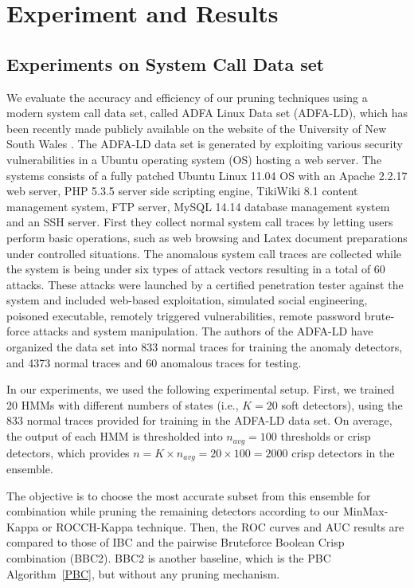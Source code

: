 \chapter{Experiment and Results} \label{chapter4}

\section{Experiments on System Call Data set}
\label{sec:experiments}

We evaluate the accuracy and efficiency of our pruning techniques using a modern system call data set, called ADFA Linux Data set (ADFA-LD), which has been recently made publicly available on the website of the University of New South Wales \cite{Creech2013a}.
The ADFA-LD data set is generated by exploiting various security vulnerabilities in a Ubuntu operating system (OS) hosting a web server.
The systems consists of a fully patched Ubuntu Linux 11.04 OS with an Apache 2.2.17 web server, PHP 5.3.5 server side scripting engine, TikiWiki 8.1 content management system, FTP server, MySQL 14.14 database management system and an SSH server.
First they collect normal system call traces by letting users perform basic operations, such as web browsing and Latex document preparations under controlled situations.
The anomalous system call traces are collected while the system is being under six types of attack vectors resulting in a total of 60 attacks.
These attacks were launched by a certified penetration tester against the system and included web-based exploitation, simulated social engineering, poisoned executable, remotely triggered vulnerabilities, remote password brute-force attacks and system manipulation.
The authors of the ADFA-LD have organized the data set into 833 normal traces for training the anomaly detectors, and 4373 normal traces and 60 anomalous traces for testing.

In our experiments, we used the following experimental setup.
First, we trained 20 HMMs with different numbers of states (i.e., $K=20$ soft detectors), using the 833 normal traces provided for training in the ADFA-LD data set.
On average, the output of each HMM is thresholded into $n_{avg} = 100$ thresholds or crisp detectors, which provides $n = K \times n_{avg} = 20\times 100 =2000$ crisp detectors in the ensemble.

The objective is to choose the most accurate subset from this ensemble for combination while pruning the remaining detectors according to our MinMax-Kappa or ROCCH-Kappa technique.
Then, the ROC curves and AUC results are compared to those of IBC and the pairwise Bruteforce Boolean Crisp combination (BBC2).
BBC2 is another baseline, which is the PBC Algorithm~\ref{PBC}, but without any pruning mechanism.

